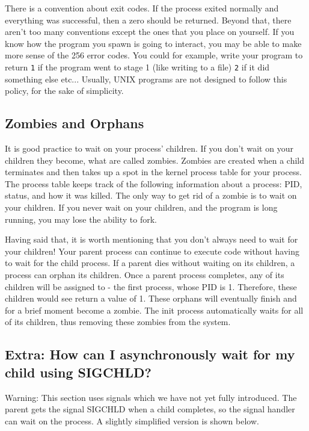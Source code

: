 \begin{itemize}
There is a convention about exit codes.
If the process exited normally and everything was successful, then a zero should be returned.
Beyond that, there aren't too many conventions except the ones that you place on yourself.
If you know how the program you spawn is going to interact, you may be able to make more sense of the 256 error codes.
You could for example, write your program to return \texttt{1} if the program went to stage 1 (like writing to a file) \texttt{2} if it did something else etc... 
Usually, UNIX programs are not designed to follow this policy, for the sake of simplicity.


\subsection{Zombies and Orphans}

It is good practice to wait on your process' children.
If you don't wait on your children they become, what are called zombies.
Zombies are created when a child terminates and then takes up a spot in the kernel process table for your process.
The process table keeps track of the following information about a process: PID, status, and how it was killed.
The only way to get rid of a zombie is to wait on your children.
If you never wait on your children, and the program is long running, you may lose the ability to fork.

Having said that, it is worth mentioning that you don't always need to wait for your children!
Your parent process can continue to execute code without having to wait for the child process.
If a parent dies without waiting on its children, a process can orphan its children.
Once a parent process completes, any of its children will be assigned to  - the first process, whose PID is 1.
Therefore, these children would see  return a value of 1.
These orphans will eventually finish and for a brief moment become a zombie.
The init process automatically waits for all of its children, thus removing these zombies from the system.

\subsection{Extra: How can I asynchronously wait for my child using SIGCHLD?}

Warning: This section uses signals which we have not yet fully introduced.
The parent gets the signal SIGCHLD when a child completes, so the signal handler can wait on the process.
A slightly simplified version is shown below.


\end{itemize}
